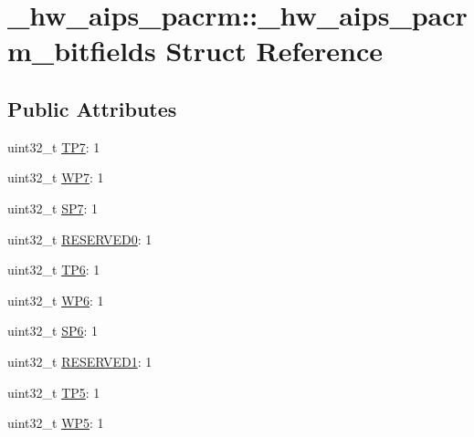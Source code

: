 \hypertarget{struct__hw__aips__pacrm_1_1__hw__aips__pacrm__bitfields}{}\section{\+\_\+hw\+\_\+aips\+\_\+pacrm\+:\+:\+\_\+hw\+\_\+aips\+\_\+pacrm\+\_\+bitfields Struct Reference}
\label{struct__hw__aips__pacrm_1_1__hw__aips__pacrm__bitfields}
\subsection*{Public Attributes}
\begin{DoxyCompactItemize}
\item 
uint32\+\_\+t \hyperlink{struct__hw__aips__pacrm_1_1__hw__aips__pacrm__bitfields_a03d546aa2dda80653d495bdf17d4e56d}{T\+P7}\+: 1
\item 
uint32\+\_\+t \hyperlink{struct__hw__aips__pacrm_1_1__hw__aips__pacrm__bitfields_a78c9c1069b39d7aad2cae115913ce014}{W\+P7}\+: 1
\item 
uint32\+\_\+t \hyperlink{struct__hw__aips__pacrm_1_1__hw__aips__pacrm__bitfields_a62680d90b1e9644d2920010fa6b17d66}{S\+P7}\+: 1
\item 
uint32\+\_\+t \hyperlink{struct__hw__aips__pacrm_1_1__hw__aips__pacrm__bitfields_a2eb7e6d557ef8812cb8c4e2155122719}{R\+E\+S\+E\+R\+V\+E\+D0}\+: 1
\item 
uint32\+\_\+t \hyperlink{struct__hw__aips__pacrm_1_1__hw__aips__pacrm__bitfields_a8ec897e24ec75d2f8a98cdbef3415055}{T\+P6}\+: 1
\item 
uint32\+\_\+t \hyperlink{struct__hw__aips__pacrm_1_1__hw__aips__pacrm__bitfields_af5199f2eacdfd9d98d74cb99760a9700}{W\+P6}\+: 1
\item 
uint32\+\_\+t \hyperlink{struct__hw__aips__pacrm_1_1__hw__aips__pacrm__bitfields_a92ddef43e14683e4ddc1d588c7627771}{S\+P6}\+: 1
\item 
uint32\+\_\+t \hyperlink{struct__hw__aips__pacrm_1_1__hw__aips__pacrm__bitfields_a42c6375d673b47cd23bcac66b75cb5ae}{R\+E\+S\+E\+R\+V\+E\+D1}\+: 1
\item 
uint32\+\_\+t \hyperlink{struct__hw__aips__pacrm_1_1__hw__aips__pacrm__bitfields_a2a5be47275bbeeee6d0e31b9d147de87}{T\+P5}\+: 1
\item 
uint32\+\_\+t \hyperlink{struct__hw__aips__pacrm_1_1__hw__aips__pacrm__bitfields_afa0dba741ba5e500e5ee8546ce43995f}{W\+P5}\+: 1

\end{DoxyCompactItemize}
